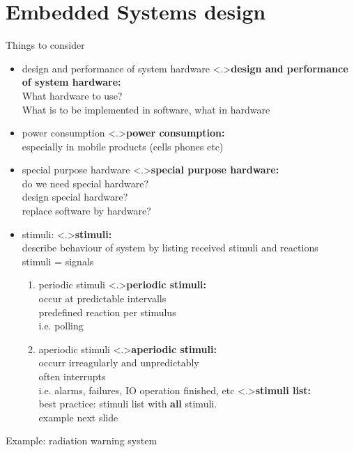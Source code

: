 \documentclass[ngerman={babel}, utf8, bigger, xcolor={table,dvipsnames}, ompress, hyperref={bookmarks,colorlinks}]{beamer}
\begin{document}
\section{Embedded Systems design}
\begin{frame}{Things to consider}
	\begin{itemize}
		\item design and performance of system hardware
		\note<.>{\textbf{design and performance of system hardware:}\\What hardware to use? \\ What is to be implemented in software, what in hardware}
		\item power consumption
		\note<.>{\textbf{power consumption:}\\ especially in mobile products (cells phones etc)}
		\item special purpose hardware
		\note<.>{\textbf{special purpose hardware:}\\ do we need special hardware? \\ design special hardware? \\ replace software by hardware?}
		\item stimuli:
		\note<.>{\textbf{stimuli:}\\ describe behaviour of system by listing received stimuli and reactions \\ stimuli = signals \\}
			\begin{enumerate}
				\item periodic stimuli
				\note<.>{\textbf{periodic stimuli:}\\occur at predictable intervalls \\ predefined reaction per stimulus \\ i.e. polling}
				\item aperiodic stimuli
				\note<.>{\textbf{aperiodic stimuli:}\\ occurr irreagularly and unpredictably \\ often interrupts \\ i.e. alarms, failures, IO operation finished, etc}
				\note<.>{\textbf{stimuli list:}\\best practice: stimuli list with \textbf{all} stimuli. \\ example next slide}
			\end{enumerate}
	\end{itemize}
\end{frame}

\begin{frame}{Example: radiation warning system}
	
\end{frame}
\end{document}
